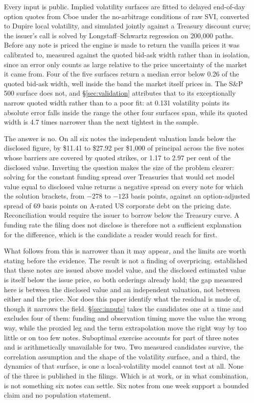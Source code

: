 Every input is public. Implied volatility surfaces are fitted to delayed
end-of-day option quotes from Cboe under the no-arbitrage conditions of raw
SVI, converted to Dupire local volatility, and simulated jointly against a
Treasury discount curve; the issuer's call is solved by Longstaff--Schwartz
regression on 200{,}000 paths. Before any note is priced the engine is made
to return the vanilla prices it was calibrated to, measured against the quoted
bid-ask width rather than in isolation, since an error only counts as large
relative to the price uncertainty of the market it came from. Four of the five
surfaces return a median error below 0.26 of the quoted bid-ask width, well
inside the band the market itself prices in. The S\&P 500 surface does not, and
\S\ref{sec:validation} attributes that to its exceptionally narrow quoted width
rather than to a poor fit: at 0.131 volatility points its absolute error falls
inside the range the other four surfaces span, while its quoted width is 4.7
times narrower than the next tightest in the sample.

The answer is no. On all six notes the independent valuation lands below the
disclosed figure, by \$11.41 to \$27.92 per \$1{,}000 of principal across the
five notes whose barriers are covered by quoted strikes, or 1.17 to 2.97 per
cent of the disclosed value. Inverting the question makes the size of the
problem clearer: solving for the constant funding spread over Treasuries that
would set model value equal to disclosed value returns a negative spread on
every note for which the solution brackets, from $-278$ to $-123$ basis points,
against an option-adjusted spread of 69 basis points on A-rated US corporate
debt on the pricing date. Reconciliation would require the issuer to borrow
below the Treasury curve. A funding rate the filing does not disclose is
therefore not a sufficient explanation for the difference, which is the
candidate a reader would reach for first.

What follows from this is narrower than it may appear, and the limits are worth
stating before the evidence. The result is not a finding of overpricing.
\citet{Henderson2011} established that these notes are issued above model
value, and the disclosed estimated value is itself below the issue price, so
both orderings already hold; the gap measured here is between the disclosed
value and an independent valuation, not between either and the price. Nor does this paper
identify what the residual is made of, though it narrows the field.
\S\ref{sec:inputs} takes the candidates one at a time and excludes four of
them: funding and observation timing move the value the wrong way, while the
proxied leg and the term extrapolation move the right way by too little or on
too few notes. Suboptimal exercise accounts for part of three notes and is
arithmetically unavailable for two. Two measured candidates survive, the
correlation assumption and the shape of the volatility surface, and a third,
the dynamics of that surface, is one a local-volatility model cannot test at
all. None of the three is published in the filings. Which is at work, or in
what combination, is not something six notes can settle. Six notes from
one week support a bounded claim and no population statement.

